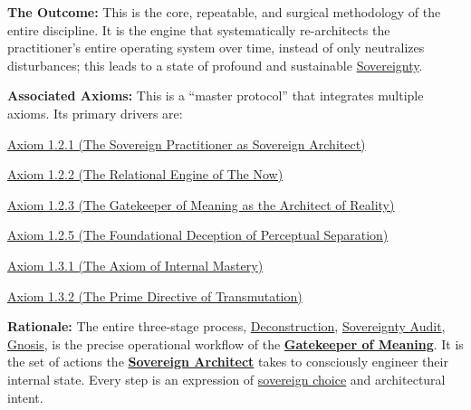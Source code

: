 \documentclass{article}
\begin{document}
\begin{nobullet}
\begin{enumerate}
\begin{enumerate}[leftmargin=*, label=Step \arabic*]
        \end{enumerate}
    \end{enumerate}  
    \item \textbf{The Outcome:} This is the core, repeatable, and surgical methodology of the entire discipline. It is the engine that systematically re-architects the practitioner's entire operating system over time, instead of only neutralizes disturbances; this leads to a state of profound and sustainable \hyperlink{gloss:sovereignty}{Sovereignty}.
    \item \textbf{Associated Axioms:} This is a ``master protocol'' that integrates multiple axioms. Its primary drivers are:
        \begin{nobullet}
            \item \hyperref[axiom_1_2_1_the_sorvereign_practitioner_as_sovereign_architect]{Axiom 1.2.1 (The Sovereign Practitioner as Sovereign Architect)}
            \item \hyperref[axiom_1_2_2_the_relational_engine_of_the_now]{Axiom 1.2.2 (The Relational Engine of The Now)}
            \item \hyperref[axiom_1_2_3_the_gatekeeper_of_meaning_as_the_architect_of_reality]{Axiom 1.2.3 (The Gatekeeper of Meaning as the Architect of Reality)}
            \item \hyperref[axiom_1_2_5_the_foundational_deception_of_perceptual_separation]{Axiom 1.2.5 (The Foundational Deception of Perceptual Separation)}
            \item \hyperref[axiom_1_3_1_the_axiom_of_internal_mastery]{Axiom 1.3.1 (The Axiom of Internal Mastery)}
            \item \hyperref[axiom_1_3_2_the_prime_directive_of_transmutation]{Axiom 1.3.2 (The Prime Directive of Transmutation)}
        \end{nobullet}
    \begin{nobullet}
        \item \textbf{Rationale:} The entire three-stage process, \hyperlink{gloss:deconstruction}{Deconstruction}, \hyperlink{gloss:sovereignty_audit}{Sovereignty Audit}, \hyperlink{gloss:gnosis}{Gnosis}, is the precise operational workflow of the \textbf{\hyperlink{gloss:gatekeeper_of_meaning}{Gatekeeper of Meaning}}. It is the set of actions the \textbf{\hyperlink{gloss:sovereign_architect}{Sovereign Architect}} takes to consciously engineer their internal state. Every step is an expression of \hyperlink{gloss:sovereign_choice}{sovereign choice} and architectural intent.
    \end{nobullet}
\end{nobullet}
\end{document}
